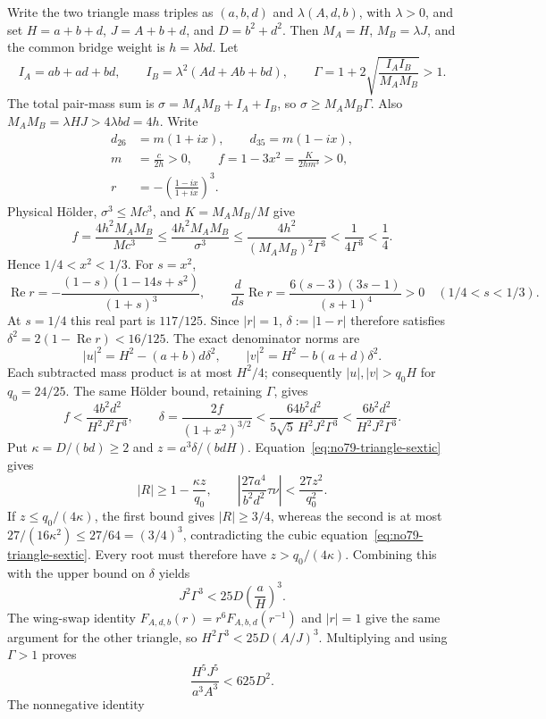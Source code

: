 \documentclass[11pt]{amsart}
\theoremstyle{remark}
\begin{document}
Write the two triangle mass triples as $(a,b,d)$ and $\lambda(A,d,b)$, with $\lambda>0$, and set $H=a+b+d$, $J=A+b+d$, and $D=b^2+d^2$. Then $M_A=H$, $M_B=\lambda J$, and the common bridge weight is $h=\lambda bd$. Let
\[
I_A=ab+ad+bd,\qquad I_B=\lambda^2(Ad+Ab+bd),\qquad
\Gamma=1+2\sqrt{\frac{I_AI_B}{M_AM_B}}>1.
\]
The total pair-mass sum is $\sigma=M_AM_B+I_A+I_B$, so $\sigma\ge M_AM_B\Gamma$. Also $M_AM_B=\lambda HJ>4\lambda bd=4h$. Write
\[
\begin{aligned}
d_{26}&=m(1+ix),\qquad d_{35}=m(1-ix),\\
m&=\frac{c}{2h}>0,\qquad f=1-3x^2=\frac{K}{2hm^3}>0,\\
r&=-\left(\frac{1-ix}{1+ix}\right)^3.
\end{aligned}
\]
Physical H\"older, $\sigma^3\le Mc^3$, and $K=M_AM_B/M$ give
\[
f=\frac{4h^2M_AM_B}{Mc^3}
\le\frac{4h^2M_AM_B}{\sigma^3}
\le\frac{4h^2}{(M_AM_B)^2\Gamma^3}<\frac{1}{4\Gamma^3}<\frac14.
\]
Hence $1/4<x^2<1/3$. For $s=x^2$,
\[
\operatorname{Re}r=-\frac{(1-s)(1-14s+s^2)}{(1+s)^3},\qquad
\frac{d}{ds}\operatorname{Re}r=\frac{6(s-3)(3s-1)}{(s+1)^4}>0
\quad (1/4<s<1/3).
\]
At $s=1/4$ this real part is $117/125$. Since $|r|=1$, $\delta:=|1-r|$ therefore satisfies $\delta^2=2(1-\operatorname{Re}r)<16/125$. The exact denominator norms are
\[
|u|^2=H^2-(a+b)d\delta^2,\qquad
|v|^2=H^2-b(a+d)\delta^2.
\]
Each subtracted mass product is at most $H^2/4$; consequently $|u|,|v|>q_0H$ for $q_0=24/25$. The same H\"older bound, retaining $\Gamma$, gives
\[
f<\frac{4b^2d^2}{H^2J^2\Gamma^3},\qquad
\delta=\frac{2f}{(1+x^2)^{3/2}}
<\frac{64b^2d^2}{5\sqrt5\,H^2J^2\Gamma^3}
<\frac{6b^2d^2}{H^2J^2\Gamma^3}.
\]
Put $\kappa=D/(bd)\ge2$ and $z=a^3\delta/(bdH)$. Equation~\eqref{eq:no79-triangle-sextic} gives
\[
|R|\ge1-\frac{\kappa z}{q_0},\qquad
\left|\frac{27a^4}{b^2d^2}\tau\nu\right|<\frac{27z^2}{q_0^2}.
\]
If $z\le q_0/(4\kappa)$, the first bound gives $|R|\ge3/4$, whereas the second is at most $27/(16\kappa^2)\le27/64=(3/4)^3$, contradicting the cubic equation~\eqref{eq:no79-triangle-sextic}. Every root must therefore have $z>q_0/(4\kappa)$. Combining this with the upper bound on $\delta$ yields
\[
J^2\Gamma^3<25D\left(\frac aH\right)^3.
\]
The wing-swap identity $F_{A,d,b}(r)=r^6F_{A,b,d}(r^{-1})$ and $|r|=1$ give the same argument for the other triangle, so $H^2\Gamma^3<25D(A/J)^3$. Multiplying and using $\Gamma>1$ proves
\begin{equation}\label{eq:no79-equal-bridge-bound}
\frac{H^5J^5}{a^3A^3}<625D^2.
\end{equation}
The nonnegative identity
\end{document}
